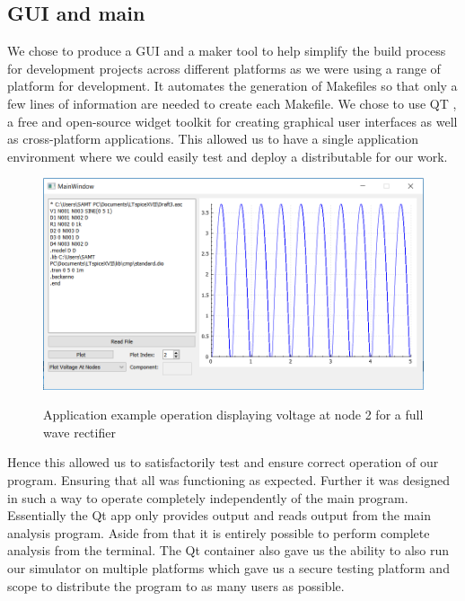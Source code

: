 \documentclass{article}
\begin{document}
\subsection{GUI and main}\label{ssec:GUIandmain}
We chose to produce a GUI and a maker tool to help simplify the build process for development projects across different platforms as we were using a range of platform for development. It automates the generation of Makefiles so that only a few lines of information are needed to create each Makefile. We chose to use QT , a free and open-source widget toolkit for creating graphical user interfaces as well as cross-platform applications. This allowed us to have a single application environment where we could easily test and deploy a distributable for our work.
\bigbreak
\begin{figure}[h]
    \caption{Application example operation displaying voltage at node 2 for a full wave rectifier}
    \centering
    \includegraphics[width=1\textwidth]{images/AppEx.PNG}
    \label{fig:AppEx}
\end{figure}
Hence this allowed us to satisfactorily test and ensure correct operation of our program. Ensuring that all was functioning as expected. Further it was designed in such a way to operate completely independently of the main program. Essentially the Qt app only provides output and reads output from the main analysis program. Aside from that it is entirely possible to perform complete analysis from the terminal.
\bigbreak
The Qt container also gave us the ability to also run our simulator on multiple platforms which gave us a secure testing platform and scope to distribute the program to as many users as possible.

\newpage
\end{document}
